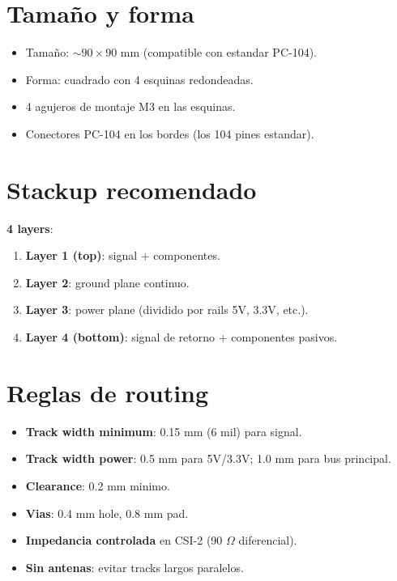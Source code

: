 \documentclass[11pt,a4paper,oneside,openright]{book}
\begin{document}
\section{Tamaño y forma}

\begin{itemize}[leftmargin=2em]
  \item Tamaño: $\sim 90 \times 90$ mm (compatible con estandar PC-104).
  \item Forma: cuadrado con 4 esquinas redondeadas.
  \item 4 agujeros de montaje M3 en las esquinas.
  \item Conectores PC-104 en los bordes (los 104 pines estandar).
\end{itemize}

\section{Stackup recomendado}

\textbf{4 layers}:
\begin{enumerate}[leftmargin=2em]
  \item \textbf{Layer 1 (top)}: signal + componentes.
  \item \textbf{Layer 2}: ground plane continuo.
  \item \textbf{Layer 3}: power plane (dividido por rails 5V, 3.3V, etc.).
  \item \textbf{Layer 4 (bottom)}: signal de retorno + componentes pasivos.
\end{enumerate}

\section{Reglas de routing}

\begin{itemize}[leftmargin=2em]
  \item \textbf{Track width minimum}: 0.15 mm (6 mil) para signal.
  \item \textbf{Track width power}: 0.5 mm para 5V/3.3V; 1.0 mm para
        bus principal.
  \item \textbf{Clearance}: 0.2 mm minimo.
  \item \textbf{Vias}: 0.4 mm hole, 0.8 mm pad.
  \item \textbf{Impedancia controlada} en CSI-2 (90 $\Omega$ diferencial).
  \item \textbf{Sin antenas}: evitar tracks largos paralelos.
\end{itemize}
\end{document}
